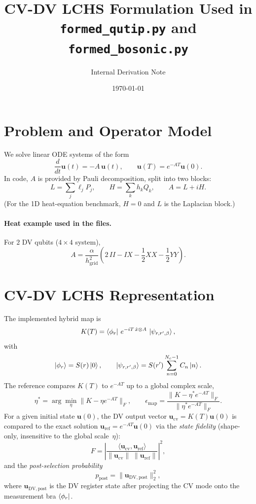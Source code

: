 \documentclass[11pt]{article}
\title{CV-DV LCHS Formulation Used in \texttt{formed\_qutip.py} and \texttt{formed\_bosonic.py}}
\author{Internal Derivation Note}
\date{\today}
\begin{document}
\maketitle

\section{Problem and Operator Model}
We solve linear ODE systems of the form
\begin{equation}
\frac{d}{dt}\bm{u}(t) = -A\,\bm{u}(t),
\qquad
\bm{u}(T)=e^{-AT}\bm{u}(0).
\end{equation}
In code, $A$ is provided by Pauli decomposition, split into two blocks:
\begin{equation}
L = \sum_j \ell_j P_j,
\qquad
H = \sum_k h_k Q_k,
\qquad
A=L+iH.
\end{equation}
(For the 1D heat-equation benchmark, $H=0$ and $L$ is the Laplacian block.)

\paragraph{Heat example used in the files.}
For $2$ DV qubits ($4\times 4$ system),
\begin{equation}
A = \frac{\alpha}{h_{\mathrm{grid}}^2}
\left(2\,II-IX-\frac12XX-\frac12YY\right).
\end{equation}

\section{CV-DV LCHS Representation}
The implemented hybrid map is
\begin{equation}
K(T)=\bra{\phi_r}\,e^{-iT\,\hat{x}\otimes A}\,\ket{\psi_{r,r',\beta}},
\label{eq:lchs-map}
\end{equation}
with
\begin{equation}
\ket{\phi_r}=S(r)\ket{0},
\qquad
\ket{\psi_{r,r',\beta}}=S(r')\sum_{n=0}^{N_c-1}C_n\ket{n}.
\end{equation}
The reference compares $K(T)$ to $e^{-AT}$ up to a global complex scale,
\begin{equation}
\eta^*=\arg\min_\eta\|K-\eta e^{-AT}\|_F,
\qquad
\epsilon_{\mathrm{map}}=\frac{\|K-\eta^*e^{-AT}\|_F}{\|\eta^*e^{-AT}\|_F}.
\end{equation}
For a given initial state $\bm{u}(0)$, the DV output vector
$\bm{u}_{\mathrm{cv}}=K(T)\bm{u}(0)$ is compared to the exact solution
$\bm{u}_{\mathrm{ref}}=e^{-AT}\bm{u}(0)$ via the \emph{state fidelity}
(shape-only, insensitive to the global scale~$\eta$):
\begin{equation}
F=\left|\frac{\langle\bm{u}_{\mathrm{cv}},\bm{u}_{\mathrm{ref}}\rangle}
{\|\bm{u}_{\mathrm{cv}}\|\;\|\bm{u}_{\mathrm{ref}}\|}\right|^2,
\end{equation}
and the \emph{post-selection probability}
\begin{equation}
p_{\mathrm{post}}=\|\bm{u}_{\mathrm{DV,post}}\|_2^2,
\end{equation}
where $\bm{u}_{\mathrm{DV,post}}$ is the DV register state after projecting
the CV mode onto the measurement bra $\bra{\phi_r}$.
\end{document}
